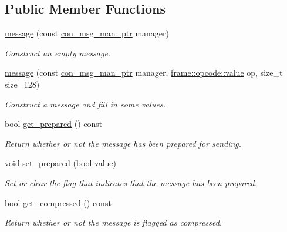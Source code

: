 \subsection*{Public Member Functions}
\begin{DoxyCompactItemize}
\item 
\hyperlink{classwebsocketpp_1_1message__buffer_1_1message_ae3cb82d2876aebcf9909d87858e0f4af}{message} (const \hyperlink{classwebsocketpp_1_1message__buffer_1_1message_abb7a33ceab94975c7503102537c33b48}{con\+\_\+msg\+\_\+man\+\_\+ptr} manager)
\begin{DoxyCompactList}\small\item\em Construct an empty message. \end{DoxyCompactList}\item 
\hyperlink{classwebsocketpp_1_1message__buffer_1_1message_a09c574d6d92b28629bed43bbbc674db1}{message} (const \hyperlink{classwebsocketpp_1_1message__buffer_1_1message_abb7a33ceab94975c7503102537c33b48}{con\+\_\+msg\+\_\+man\+\_\+ptr} manager, \hyperlink{namespacewebsocketpp_1_1frame_1_1opcode_ae68711643096dfc4af6d66ade3f9fd5e}{frame\+::opcode\+::value} op, size\+\_\+t size=128)
\begin{DoxyCompactList}\small\item\em Construct a message and fill in some values. \end{DoxyCompactList}\item 
bool \hyperlink{classwebsocketpp_1_1message__buffer_1_1message_acdaf0a0db6926930b5a714406e8ad4df}{get\+\_\+prepared} () const 
\begin{DoxyCompactList}\small\item\em Return whether or not the message has been prepared for sending. \end{DoxyCompactList}\item 
void \hyperlink{classwebsocketpp_1_1message__buffer_1_1message_a9b17bf5adb8607c44774a96b340ee55b}{set\+\_\+prepared} (bool value)
\begin{DoxyCompactList}\small\item\em Set or clear the flag that indicates that the message has been prepared. \end{DoxyCompactList}\item 
bool \hyperlink{classwebsocketpp_1_1message__buffer_1_1message_a5b3e9d98ebf8b95c3205f7ebf20ce0a1}{get\+\_\+compressed} () const 
\begin{DoxyCompactList}\small\item\em Return whether or not the message is flagged as compressed. \end{DoxyCompactList}\item 

\end{DoxyCompactItemize}
